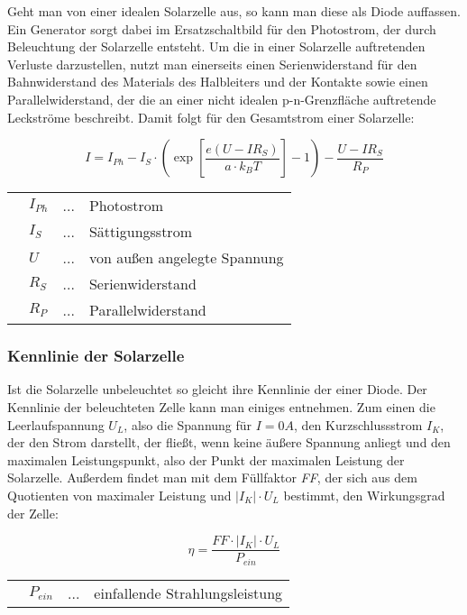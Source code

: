 \documentclass[slug=SZ, room=Hermann-Krone-Bau\,\ Labor\ 1.25, supervisor=Martin\ Kroll]{../../Lab_Report_LaTeX/lab_report}
\begin{document}
Geht man von einer idealen Solarzelle aus, so kann man diese als Diode auffassen. Ein Generator sorgt dabei
im Ersatzschaltbild für den Photostrom, der durch Beleuchtung der Solarzelle entsteht. Um die in einer
Solarzelle auftretenden Verluste darzustellen, nutzt man einerseits einen Serienwiderstand für den
Bahnwiderstand des Materials des Halbleiters und der Kontakte sowie einen Parallelwiderstand, der die an einer
nicht idealen p-n-Grenzfläche auftretende Leckströme beschreibt.
Damit folgt für den Gesamtstrom einer Solarzelle:

\begin{equation}\label{eq:ersatz}
	I = I_{Ph} - I_S \cdot (\exp[\frac{e(U-IR_S)}{a \cdot k_B T}] -1 ) - \frac{U-IR_S}{R_P}
\end{equation}

\begin{tabular}{llll}
	 & \(I_{Ph}\) & ... & Photostrom                   \\
	 & \(I_S\)    & ... & Sättigungsstrom              \\
	 & \(U\)      & ... & von außen angelegte Spannung \\
	 & \(R_S\)    & ... & Serienwiderstand             \\
	 & \(R_P\)    & ... & Parallelwiderstand
\end{tabular}

\subsubsection{Kennlinie der Solarzelle}

Ist die Solarzelle unbeleuchtet so gleicht ihre Kennlinie der einer Diode.
Der Kennlinie der beleuchteten Zelle kann man einiges entnehmen.
Zum einen die Leerlaufspannung \(U_L\), also die Spannung für \(I=0 A\), den Kurzschlussstrom \(I_K\), der den
Strom darstellt, der fließt, wenn keine äußere Spannung anliegt und den maximalen Leistungspunkt, also der Punkt
der maximalen Leistung der Solarzelle. Außerdem findet man mit dem Füllfaktor \emph{FF}, der sich aus dem
Quotienten von maximaler Leistung und \(|I_K| \cdot U_L\) bestimmt, den Wirkungsgrad der Zelle:

\begin{equation}\label{eq:wirkgrad}
	\eta = \frac{FF \cdot |I_K| \cdot U_L}{P_{ein}}
\end{equation}

\begin{tabular}{llll}
	 & \(P_{ein}\) & ... & einfallende Strahlungsleistung
\end{tabular}
\end{document}
